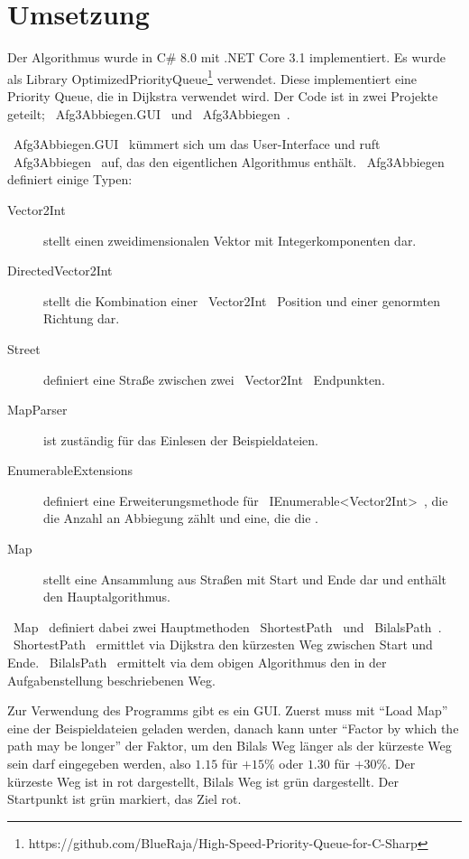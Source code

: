 \documentclass{article}
\theoremstyle{nonumberplain}
\begin{document}
\section{Umsetzung}

Der Algorithmus wurde in C\# 8.0 mit .NET Core 3.1 implementiert.
Es wurde als Library OptimizedPriorityQueue\footnote{https://github.com/BlueRaja/High-Speed-Priority-Queue-for-C-Sharp} verwendet. Diese implementiert eine Priority Queue, die in Dijkstra verwendet wird.
Der Code ist in zwei Projekte geteilt;
~Afg3Abbiegen.GUI~ und ~Afg3Abbiegen~.

~Afg3Abbiegen.GUI~ kümmert sich um das User-Interface und ruft ~Afg3Abbiegen~ auf, das den eigentlichen Algorithmus enthält.
~Afg3Abbiegen~ definiert einige Typen:

\begin{description}
    \item[Vector2Int] stellt einen zweidimensionalen Vektor mit Integerkomponenten dar.
    \item[DirectedVector2Int] stellt die Kombination einer ~Vector2Int~ Position und einer genormten Richtung dar.
    \item[Street] definiert eine Straße zwischen zwei ~Vector2Int~ Endpunkten.
    \item[MapParser] ist zuständig für das Einlesen der Beispieldateien.
    \item[EnumerableExtensions] definiert eine Erweiterungsmethode für ~IEnumerable<Vector2Int>~, die die Anzahl an Abbiegung zählt und eine, die die .
    \item[Map] stellt eine Ansammlung aus Straßen mit Start und Ende dar und enthält den Hauptalgorithmus. 
\end{description}

~Map~ definiert dabei zwei Hauptmethoden
~ShortestPath~ und ~BilalsPath~.
~ShortestPath~ ermittlet via Dijkstra den kürzesten Weg zwischen Start und Ende.
~BilalsPath~ ermittelt via dem obigen Algorithmus den in der Aufgabenstellung beschriebenen Weg.

Zur Verwendung des Programms gibt es ein GUI.
Zuerst muss mit ``Load Map'' eine der Beispieldateien geladen werden, danach kann unter ``Factor by which the path may be longer'' der Faktor, um den Bilals Weg länger als der kürzeste Weg sein darf eingegeben werden, also \(1.15\) für \(+15\%\) oder \(1.30\) für \(+30\%\).
Der kürzeste Weg ist in rot dargestellt, Bilals Weg ist grün dargestellt.
Der Startpunkt ist grün markiert, das Ziel rot.
\end{document}
